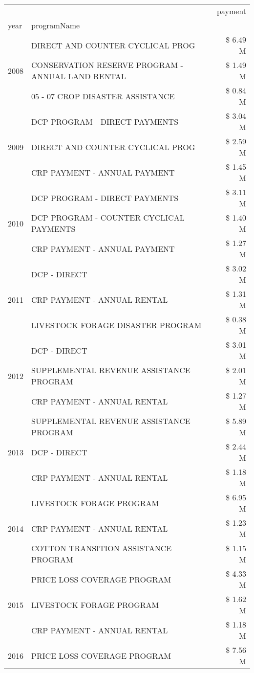 \begin{tabular}{llr}
\toprule
 &  & payment \\
year & programName &  \\
\midrule
\multirow[t]{3}{*}{2008} & DIRECT AND COUNTER CYCLICAL PROG & \$ 6.49 M \\
 & CONSERVATION RESERVE PROGRAM - ANNUAL LAND RENTAL & \$ 1.49 M \\
 & 05 - 07 CROP DISASTER ASSISTANCE & \$ 0.84 M \\
\cline{1-3}
\multirow[t]{3}{*}{2009} & DCP PROGRAM - DIRECT PAYMENTS & \$ 3.04 M \\
 & DIRECT AND COUNTER CYCLICAL PROG & \$ 2.59 M \\
 & CRP PAYMENT - ANNUAL PAYMENT & \$ 1.45 M \\
\cline{1-3}
\multirow[t]{3}{*}{2010} & DCP PROGRAM - DIRECT PAYMENTS & \$ 3.11 M \\
 & DCP PROGRAM - COUNTER CYCLICAL PAYMENTS & \$ 1.40 M \\
 & CRP PAYMENT - ANNUAL PAYMENT & \$ 1.27 M \\
\cline{1-3}
\multirow[t]{3}{*}{2011} & DCP - DIRECT & \$ 3.02 M \\
 & CRP PAYMENT - ANNUAL RENTAL & \$ 1.31 M \\
 & LIVESTOCK FORAGE DISASTER PROGRAM & \$ 0.38 M \\
\cline{1-3}
\multirow[t]{3}{*}{2012} & DCP - DIRECT & \$ 3.01 M \\
 & SUPPLEMENTAL REVENUE ASSISTANCE PROGRAM & \$ 2.01 M \\
 & CRP PAYMENT - ANNUAL RENTAL & \$ 1.27 M \\
\cline{1-3}
\multirow[t]{3}{*}{2013} & SUPPLEMENTAL REVENUE ASSISTANCE PROGRAM & \$ 5.89 M \\
 & DCP - DIRECT & \$ 2.44 M \\
 & CRP PAYMENT - ANNUAL RENTAL & \$ 1.18 M \\
\cline{1-3}
\multirow[t]{3}{*}{2014} & LIVESTOCK FORAGE PROGRAM & \$ 6.95 M \\
 & CRP PAYMENT - ANNUAL RENTAL & \$ 1.23 M \\
 & COTTON TRANSITION ASSISTANCE PROGRAM & \$ 1.15 M \\
\cline{1-3}
\multirow[t]{3}{*}{2015} & PRICE LOSS COVERAGE PROGRAM & \$ 4.33 M \\
 & LIVESTOCK FORAGE PROGRAM & \$ 1.62 M \\
 & CRP PAYMENT - ANNUAL RENTAL & \$ 1.18 M \\
\cline{1-3}
\multirow[t]{3}{*}{2016} & PRICE LOSS COVERAGE PROGRAM & \$ 7.56 M \\

\end{tabular}
